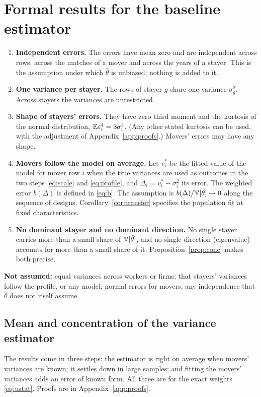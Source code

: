 \section{Formal results for the baseline estimator}\label{sec:results}

\begin{enumerate}[label=\textbf{A\arabic*.},leftmargin=3em]
\item \textbf{Independent errors.} The errors have mean zero and are independent across rows: across the
matches of a mover and across the years of a stayer. This is the assumption under which $\hat\theta$ is
unbiased; nothing is added to it.
\item \textbf{One variance per stayer.} The rows of stayer $g$ share one variance $\sigma_g^2$. Across stayers
the variances are unrestricted.
\item \textbf{Shape of stayers' errors.} They have zero third moment and the kurtosis of the normal
distribution, $\mathbb{E}\varepsilon_i^4=3\sigma_i^4$. (Any other stated kurtosis can be used, with the adjustment of
Appendix~\ref{app:proofs}.) Movers' errors may have any shape.
\item \textbf{Movers follow the model on average.} Let $v_i^*$ be the fitted value of the model for mover row
$i$ when the true variances are used as outcomes in the two steps \eqref{eq:scale} and \eqref{eq:profile}, and
$\Delta_i=v_i^*-\sigma_i^2$ its error. The weighted error $b(\Delta)$ is defined in \eqref{eq:b}. The assumption is
$b(\Delta)/\mathbb{V}[\hat\theta]\to0$ along the sequence of designs.
Corollary~\ref{cor:transfer} specifies the population fit at fixed characteristics.
\item \textbf{No dominant stayer and no dominant direction.} No single stayer carries more than a small share of
$\mathbb{V}[\hat\theta]$, and no single direction (eigenvalue) accounts for more than a small share of it;
Proposition~\ref{prop:conc} makes both precise.
\end{enumerate}

\smallskip\noindent\textbf{Not assumed:} equal variances across workers or firms; that stayers' variances
follow the profile, or any model; normal errors for movers; any independence that $\hat\theta$ does not itself
assume.

\subsection{Mean and concentration of the variance estimator}
The results come in three steps: the estimator is right on average when movers' variances are known; it
settles down in large samples; and fitting the movers' variances adds an error of known form. All three are for
the exact weights \eqref{eq:ustat}. Proofs are in Appendix~\ref{app:proofs}.

